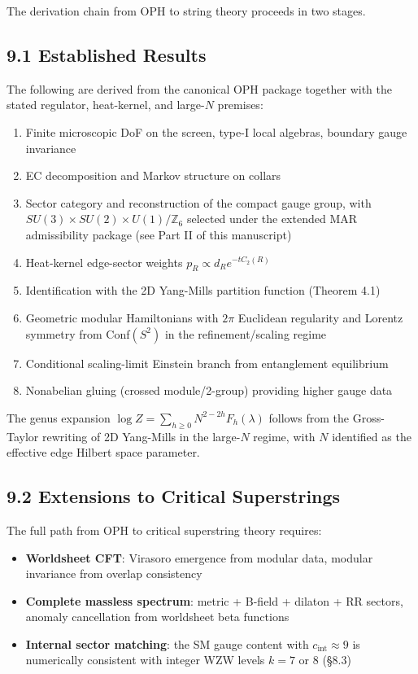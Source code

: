 The derivation chain from OPH to string theory proceeds in two stages.

\subsection{9.1 Established Results}\label{91-established-results}

The following are derived from the canonical OPH package together with the stated regulator, heat-kernel, and large-\(N\) premises:

\begin{enumerate}
\def\labelenumi{\arabic{enumi}.}
\tightlist
\item
  Finite microscopic DoF on the screen, type-I local algebras, boundary gauge invariance
\item
  EC decomposition and Markov structure on collars
\item
  Sector category and reconstruction of the compact gauge group, with \(SU(3) \times SU(2) \times U(1)/\mathbb{Z}_6\) selected under the extended MAR admissibility package (see Part II of this manuscript)
\item
  Heat-kernel edge-sector weights \(p_R \propto d_R e^{-t C_2(R)}\)
\item
  Identification with the 2D Yang-Mills partition function (Theorem 4.1)
\item
  Geometric modular Hamiltonians with \(2\pi\) Euclidean regularity and Lorentz symmetry from Conf\((S^2)\) in the refinement/scaling regime
\item
  Conditional scaling-limit Einstein branch from entanglement equilibrium
\item
  Nonabelian gluing (crossed module/2-group) providing higher gauge data
\end{enumerate}

The genus expansion \(\log Z = \sum_{h \geq 0} N^{2-2h} F_h(\lambda)\) follows from the Gross-Taylor rewriting of 2D Yang-Mills in the large-\(N\) regime, with \(N\) identified as the effective edge Hilbert space parameter.

\subsection{9.2 Extensions to Critical Superstrings}\label{92-extensions-to-critical-superstrings}

The full path from OPH to critical superstring theory requires:

\begin{itemize}
\tightlist
\item
  \textbf{Worldsheet CFT}: Virasoro emergence from modular data, modular invariance from overlap consistency
\item
  \textbf{Complete massless spectrum}: metric + B-field + dilaton + RR sectors, anomaly cancellation from worldsheet beta functions
\item
  \textbf{Internal sector matching}: the SM gauge content with \(c_{\text{int}} \approx 9\) is numerically consistent with integer WZW levels \(k = 7\) or \(8\) (§8.3)
\end{itemize}

